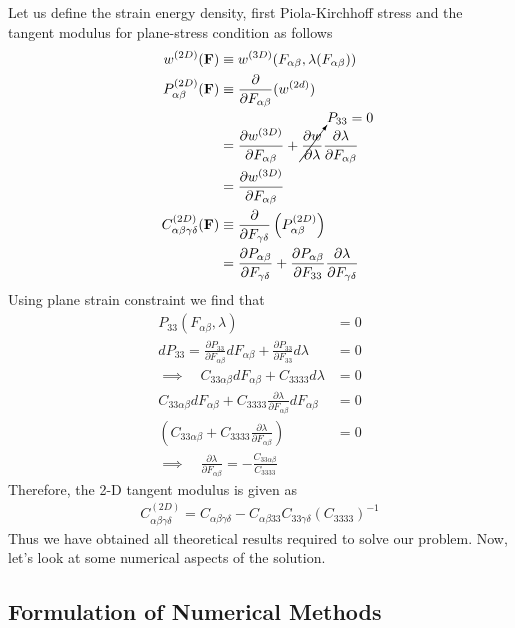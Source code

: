 \message{ !name(p1_2.tex)}\documentclass[../main.tex]{subfiles}
\begin{document}
Let us define the strain energy density, first Piola-Kirchhoff stress
and the tangent modulus for plane-stress condition as follows
\begin{align*}
  w^{(2D)}(\mathbf{F}) &\equiv w^{(3D)}(F_{\alpha\beta},\lambda(F_{\alpha\beta}))\\
  P^{(2D)}_{\alpha\beta}(\mathbf{F})&\equiv \frac{\partial}{\partial F_{\alpha\beta}}(w^{(2d)})\\
                       &= \frac{\partial w^{(3D)}}{\partial F_{\alpha\beta}} +\cancelto{P_{33}=0}{\frac{\partial w}{\partial \lambda}}\frac{\partial \lambda}{\partial F_{\alpha\beta}}\\
                       &= \frac{\partial w^{(3D)}}{\partial F_{\alpha\beta}}\\
  C^{(2D)}_{\alpha\beta\gamma\delta}(\mathbf{F})&\equiv \frac{\partial}{\partial F_{\gamma\delta}}\left(P^{(2D)}_{\alpha\beta}\right)\\
                       &=\frac{\partial P_{\alpha\beta}}{\partial F_{\gamma\delta}} + \frac{\partial P_{\alpha\beta}}{\partial F_{33}}\frac{\partial\lambda}{\partial F_{\gamma\delta}}
\end{align*}
Using plane strain constraint we find that
\begin{align*}
  P_{33}(F_{\alpha\beta},\lambda)&=0\\
  dP_{33} = \frac{\partial P_{33}}{\partial F_{\alpha\beta}}dF_{\alpha\beta} + \frac{\partial P_{33}}{\partial F_{33}}d\lambda &= 0\\
  \implies \quad C_{33\alpha\beta}dF_{\alpha\beta}+C_{3333}d\lambda &=0\\
  C_{33\alpha\beta}dF_{\alpha\beta}+C_{3333}\frac{\partial\lambda}{\partial F_{\alpha\beta}}dF_{\alpha\beta} &=0\\
  \left(C_{33\alpha\beta}+C_{3333}\frac{\partial\lambda}{\partial F_{\alpha\beta}}\right) &=0\\
  \implies\quad\boxed{\frac{\partial\lambda}{\partial F_{\alpha\beta}} = -\frac{C_{33\alpha\beta}}{C_{3333}}}
\end{align*}
Therefore, the 2-D tangent modulus is given as
\begin{align*}
  \boxed{C^{(2D)}_{\alpha\beta\gamma\delta} = C_{\alpha\beta\gamma\delta} - C_{\alpha\beta33}C_{33\gamma\delta}\left(C_{3333}\right)^{-1}}
\end{align*}
Thus we have obtained all theoretical results required to solve our
problem. Now, let's look at some numerical aspects of the solution.
\subsection{Formulation of Numerical Methods}
\end{document}
